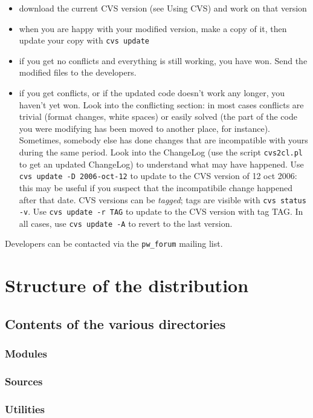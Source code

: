 \documentclass[12pt,a4paper]{article}
\begin{document}
\begin{itemize}
\item download the current CVS version (see Using CVS) and work on that version
\item when you are happy with your modified version, make a copy of
  it, then update your copy with \texttt{cvs update} 
\item if you get no conflicts and everything is still working, you
  have won. Send the modified files to the developers. 
\item if you get conflicts, or if the updated code doesn't work any
  longer, you haven't yet won. Look into the conflicting section: in
  most cases conflicts are trivial (format changes, white spaces) or
  easily solved (the part of the code you were modifying has been
  moved to another place, for instance). Sometimes, somebody else has
  done changes that are incompatible with yours during the same
  period. Look into the ChangeLog (use the script \texttt{cvs2cl.pl}
  to get an updated ChangeLog) to understand what may have happened.   
Use \texttt{cvs update -D 2006-oct-12} to update to the CVS version 
of 12 oct 2006: this may be useful if you suspect that the incompatibile 
change happened after that date. CVS versions can be {\em tagged}; 
tags are visible with \texttt{cvs status -v}. Use \texttt{cvs update -r TAG}
to update to the CVS version with tag TAG. In all cases, use 
\texttt{cvs update -A} to revert to the last version.
\end{itemize}
Developers can be contacted via the \texttt{pw\_forum} mailing list.

\section{ Structure of the distribution}
\subsection{Contents of the various directories}
\subsubsection{ Modules}
\subsubsection{ Sources}
\subsubsection{ Utilities}
\end{document}
